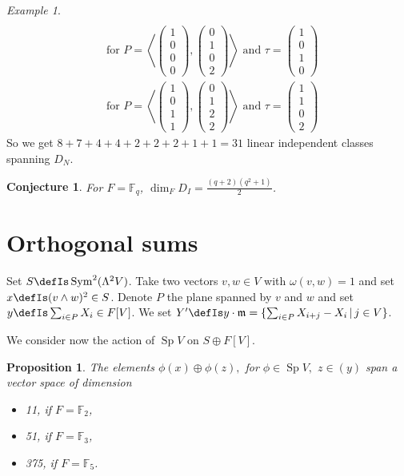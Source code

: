 \documentclass{amsart}
\DeclareMathOperator{\Sp}{Sp}
\DeclareMathOperator{\Sym}{Sym}
\newcommand{\vect}[1]{\left( \begin{smallmatrix} #1 \end{smallmatrix} \right)}
\newcommand{\plan}[2]{\left< \vect{ #1 }, \vect{ #2 } \right>}
\theoremstyle{plain}
\newtheorem{proposition}[theorem]{Proposition}
\newtheorem{conjecture}[theorem]{Conjecture}
\theoremstyle{definition}
\theoremstyle{remark}
\newtheorem{example}[theorem]{Example}
\begin{document}
\begin{example}
\begin{align}
\\
&\text{for } P=\plan{1\\0\\0\\0}{0\\1\\0\\2} \text{ and } \tau = \vect{1\\0\\1\\0}
\\
&\text{for } P=\plan{1\\0\\1\\1}{0\\1\\2\\2} \text{ and } \tau = \vect{1\\1\\0\\2}
\end{align}
So we get $8+7+4+4+2+2+2+1+1 = 31$ linear independent classes spanning $D_N$.
\end{example}

\begin{conjecture}
For $F=\mathbb F_q$, $\dim_F D_I = \frac{(q+2)(q^2+1)}{2}$.
\end{conjecture}


\section{Orthogonal sums}
Set $S\defIs \Sym^2 (\Lambda^2V)$. Take two vectors $v,w\in V$ with $\omega(v,w)=1$ and set $x\defIs  (v\wedge w)^2\in S$. Denote $P$ the plane spanned by $v$ and $w$ and set $y\defIs  \sum_{i\in P}X_i\in  F[V]$.
We set $Y'\defIs y\cdot \mathfrak{m} = \{\sum_{i\in P} X_{i+j}-X_i\,|\, j\in V \} $.

We consider now the action of $\Sp V$ on $S\oplus F[V]$. 
\begin{proposition}
The elements $\phi(x)\oplus \phi(z),$ for $\phi \in \Sp V,$ $z \in (y)$ span a vector space of dimension
\begin{itemize}
\item 11, if $F=\mathbb F_2$,
\item 51, if $F=\mathbb F_3$,
\item 375, if $F=\mathbb F_5$.
\end{itemize}
\end{proposition}
\end{document}
